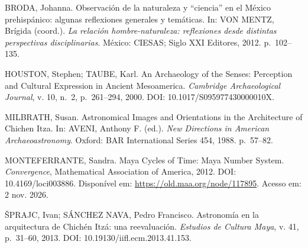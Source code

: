 \documentclass[
  brazilian,
]{article}
\begin{document}
BRODA, Johanna. Observación de la naturaleza y ``ciencia'' en el México
prehispánico: algunas reflexiones generales y temáticas. In: VON MENTZ,
Brígida (coord.). \emph{La relación hombre-naturaleza: reflexiones desde
distintas perspectivas disciplinarias}. México: CIESAS; Siglo XXI
Editores, 2012. p.~102--135.

HOUSTON, Stephen; TAUBE, Karl. An Archaeology of the Senses: Perception
and Cultural Expression in Ancient Mesoamerica. \emph{Cambridge
Archaeological Journal}, v. 10, n.~2, p.~261--294, 2000. DOI:
10.1017/S095977430000010X.

MILBRATH, Susan. Astronomical Images and Orientations in the
Architecture of Chichen Itza. In: AVENI, Anthony F. (ed.). \emph{New
Directions in American Archaeoastronomy}. Oxford: BAR International
Series 454, 1988. p.~57--82.

MONTEFERRANTE, Sandra. Maya Cycles of Time: Maya Number System.
\emph{Convergence}, Mathematical Association of America, 2012. DOI:
10.4169/loci003886. Disponível em:
\url{https://old.maa.org/node/117895}. Acesso em: 2 nov. 2026.

ŠPRAJC, Ivan; SÁNCHEZ NAVA, Pedro Francisco. Astronomía en la
arquitectura de Chichén Itzá: una reevaluación. \emph{Estudios de
Cultura Maya}, v. 41, p.~31--60, 2013. DOI:
10.19130/iifl.ecm.2013.41.153.
\end{document}

